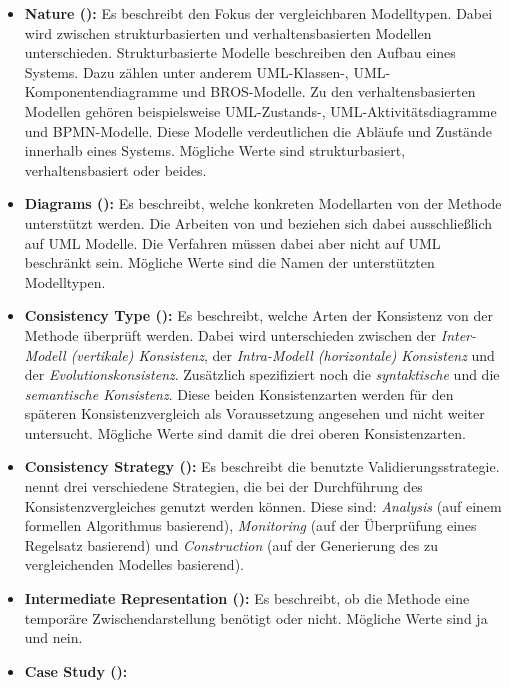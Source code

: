 \begin{itemize}
    \item \textbf{Nature (\cite{Usman2008}):}
    Es beschreibt den Fokus der vergleichbaren Modelltypen.
    Dabei wird zwischen strukturbasierten und verhaltensbasierten Modellen unterschieden.
    Strukturbasierte Modelle beschreiben den Aufbau eines Systems. Dazu zählen unter anderem UML-Klassen-, UML-Komponentendiagramme und BROS-Modelle.
    Zu den verhaltensbasierten Modellen gehören beispielsweise UML-Zustands-, UML-Aktivitätsdiagramme und BPMN-Modelle.
    Diese Modelle verdeutlichen die Abläufe und Zustände innerhalb eines Systems.
    Mögliche Werte sind strukturbasiert, verhaltensbasiert oder beides.
    \item \textbf{Diagrams (\cite{Usman2008}):}
    Es beschreibt, welche konkreten Modellarten von der Methode unterstützt werden.
    Die Arbeiten von \cite{Usman2008} und \cite{Lucas2009} beziehen sich dabei ausschließlich auf UML Modelle.
    Die Verfahren müssen dabei aber nicht auf UML beschränkt sein.
    Mögliche Werte sind die Namen der unterstützten Modelltypen.
    \clearpage
    \item \textbf{Consistency Type (\cite{Usman2008}):}
    Es beschreibt, welche Arten der Konsistenz von der Methode überprüft werden.
    Dabei wird unterschieden zwischen der \emph{Inter-Modell (vertikale) Konsistenz}, der \emph{Intra-Modell (horizontale) Konsistenz} und der \emph{Evolutionskonsistenz}.
    Zusätzlich spezifiziert \cite{Usman2008} noch die \emph{syntaktische} und die \emph{semantische Konsistenz}.
    Diese beiden Konsistenzarten werden für den späteren Konsistenzvergleich als Voraussetzung angesehen und nicht weiter untersucht.
    Mögliche Werte sind damit die drei oberen Konsistenzarten.
    \item \textbf{Consistency Strategy (\cite{Usman2008}):}
    Es beschreibt die benutzte Validierungsstrategie.
    \cite{Usman2008} nennt drei verschiedene Strategien, die bei der Durchführung des Konsistenzvergleiches genutzt werden können.
    Diese sind: \emph{Analysis} (auf einem formellen Algorithmus basierend), \emph{Monitoring} (auf der Überprüfung eines Regelsatz basierend) und \emph{Construction} (auf der Generierung des zu vergleichenden Modelles basierend).
    \item \textbf{Intermediate Representation (\cite{Usman2008}):}
    Es beschreibt, ob die Methode eine temporäre Zwischendarstellung benötigt oder nicht.
    Mögliche Werte sind ja und nein. 
    \item \textbf{Case Study (\cite{Usman2008}):}

\end{itemize}
